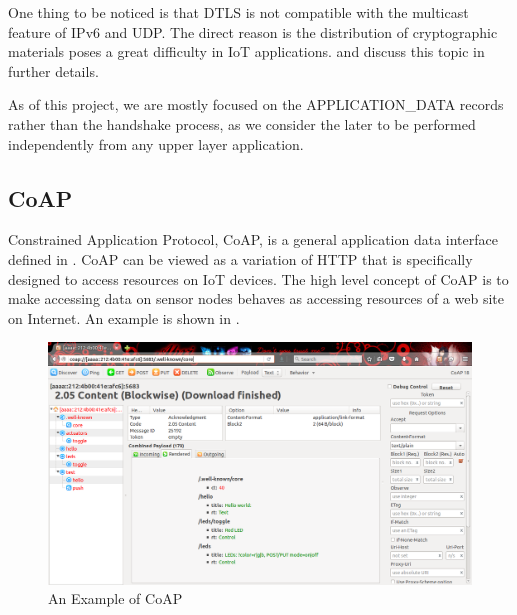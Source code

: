 One thing to be noticed is that DTLS is not compatible with the multicast feature of IPv6 and UDP. The direct reason is the distribution of cryptographic materials poses a great difficulty in IoT applications. \cite{DtlsMulticast1} and \cite{DtlsMulticast2} discuss this topic in further details.

As of this project, we are mostly focused on the APPLICATION\_DATA records rather than the handshake process, as we consider the later to be performed independently from any upper layer application.

\subsection{CoAP}
Constrained Application Protocol, CoAP, is a general application data interface defined in \cite{rfc7252}. CoAP can be viewed as a variation of HTTP that is specifically designed to access resources on IoT devices. The high level concept of CoAP is to make accessing data on sensor nodes behaves as accessing resources of a web site on Internet. An example is shown in .
\begin{figure}[h!]
	\center
	\includegraphics[width=1\textwidth]{fig/CoapExample.png}
	\caption{An Example of CoAP}
	\label{Fig: An Example of CoAP}
\end{figure}

